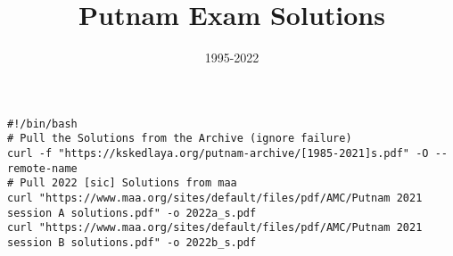 \documentclass{article}
\title{Putnam Exam Solutions}
\date{1995-2022}
\author{}
\begin{document}
\maketitle
\begin{center}
\begin{BVerbatim}
#!/bin/bash
# Pull the Solutions from the Archive (ignore failure)
curl -f "https://kskedlaya.org/putnam-archive/[1985-2021]s.pdf" -O --remote-name
# Pull 2022 [sic] Solutions from maa
curl "https://www.maa.org/sites/default/files/pdf/AMC/Putnam 2021 session A solutions.pdf" -o 2022a_s.pdf
curl "https://www.maa.org/sites/default/files/pdf/AMC/Putnam 2021 session B solutions.pdf" -o 2022b_s.pdf
\end{BVerbatim}
\end{center}
\newpage
%
%
%
%
%
%
%
%
%
%
%




























\end{document}
